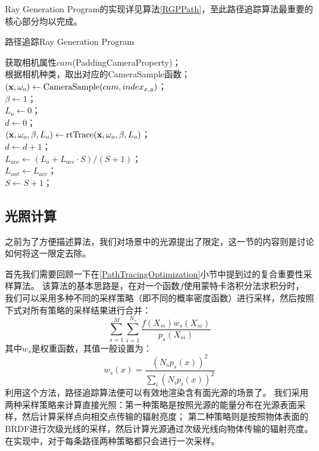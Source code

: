 Ray Generation Program的实现详见算法\ref{RGPPath}，至此路径追踪算法最重要的核心部分均以完成。
\begin{algorithm}
    \caption{路径追踪Ray Generation Program}
    \label{RGPPath}

    获取相机属性$cam$(PaddingCameraProperty)；\\
    根据相机种类，取出对应的CameraSample函数；\\
    $(\textbf{x}, \omega_o) \leftarrow {\rm CameraSample}(cam, index_{x,y})$；\\
    $\beta \leftarrow 1$；\\
    $L_o \leftarrow 0$；\\
    $d \leftarrow 0$；\\
    {
        $(\textbf{x}, \omega_o, \beta, L_o) \leftarrow {\rm rtTrace}(\textbf{x}, \omega_o, \beta, L_o)$；\\
        $d \leftarrow d+1$； \\
    }
    $L_{acc} \leftarrow (L_o+L_{acc}\cdot S)/(S+1)$；\\
    $L_{out} \leftarrow L_{acc}$；\\
    $S \leftarrow S+1$；
\end{algorithm}

\subsection{光照计算}

之前为了方便描述算法，我们对场景中的光源提出了限定，这一节的内容则是讨论如何将这一限定去除。

首先我们需要回顾一下在\ref{PathTracingOptimization}小节中提到过的复合重要性采样算法。
该算法的基本思路是，在对一个函数$f$使用蒙特卡洛积分法求积分时，
我们可以采用多种不同的采样策略（即不同的概率密度函数）进行采样，然后按照下式对所有策略的采样结果进行合并：
\begin{equation}
    \sum_{s=1}^{M} \sum_{i=1}^{N_s}\frac{f(X_{si})w_s(X_{si})}{p_s(X_{si})}
\end{equation}
其中$w_s$是权重函数，其值一般设置为：
\begin{equation}
    w_s(x) = \frac{(N_sp_s(x))^2}{\sum_i(N_ip_i(x))^2}
\end{equation}
利用这个方法，路径追踪算法便可以有效地渲染含有面光源的场景了。
我们采用两种采样策略来计算直接光照：第一种策略是按照光源的能量分布在光源表面采样，然后计算采样点向相交点传输的辐射亮度；
第二种策略则是按照物体表面的BRDF进行次级光线的采样，然后计算光源通过次级光线向物体传输的辐射亮度。
在实现中，对于每条路径两种策略都只会进行一次采样。

